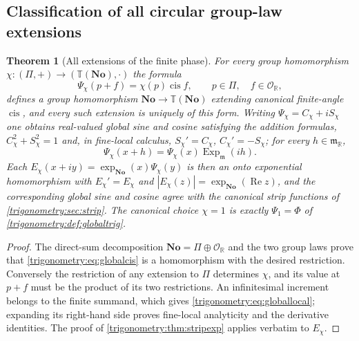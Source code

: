 \documentclass[11pt,letterpaper]{article}
\numberwithin{equation}{section}
\newtheorem{theorem}{Theorem}[section]
\theoremstyle{definition}
\theoremstyle{remark}
\newcommand{\No}{\mathbf{No}}
\newcommand{\R}{\mathbb R}
\newcommand{\OO}{\mathcal O}
\newcommand{\mm}{\mathfrak m}
\newcommand{\TT}{\mathbb T}
\newcommand{\re}{\operatorname{Re}}
\newcommand{\cis}{\operatorname{cis}}
\newcommand{\Ex}{\operatorname{Exp}_{\mm}}
\begin{document}
\subsection{Classification of all circular group-law extensions}
\begin{theorem}[All extensions of the finite phase]\label{trigonometry:thm:characters}
For every group homomorphism $\chi:(\Pi,+)\to(\TT(\No),\cdot)$ the formula
\begin{equation}\label{trigonometry:eq:globalcis}
 \Psi_\chi(p+f)=\chi(p)\cis f,\qquad p\in\Pi,\quad f\in\OO_{\R},
\end{equation}
defines a group homomorphism $\No\to\TT(\No)$ extending canonical finite-angle $\cis$, and every
such extension is uniquely of this form. Writing $\Psi_\chi=C_\chi+iS_\chi$ one obtains real-valued
global sine and cosine satisfying the addition formulas, $C_\chi^2+S_\chi^2=1$ and, in fine-local
calculus, $S_\chi'=C_\chi$, $C_\chi'=-S_\chi$; for every $h\in\mm_{\R}$,
\begin{equation}\label{trigonometry:eq:globallocal}
 \Psi_\chi(x+h)=\Psi_\chi(x)\Ex(ih).
\end{equation}
Each $E_\chi(x+iy)=\exp_{\No}(x)\Psi_\chi(y)$ is then an onto exponential homomorphism with
$E_\chi'=E_\chi$ and $|E_\chi(z)|=\exp_{\No}(\re z)$, and the corresponding global sine and cosine
agree with the canonical strip functions of \cref{trigonometry:sec:strip}. The canonical choice
$\chi=1$ is exactly $\Psi_1=\Phi$ of \cref{trigonometry:def:globaltrig}.
\end{theorem}
\begin{proof}
The direct-sum decomposition $\No=\Pi\oplus\OO_{\R}$ and the two group laws prove that
\cref{trigonometry:eq:globalcis} is a homomorphism with the desired restriction. Conversely the
restriction of any extension to $\Pi$ determines $\chi$, and its value at $p+f$ must be the product
of its two restrictions. An infinitesimal increment belongs to the finite summand, which gives
\cref{trigonometry:eq:globallocal}; expanding its right-hand side proves fine-local analyticity and
the derivative identities. The proof of \cref{trigonometry:thm:stripexp} applies verbatim to
$E_\chi$.
\end{proof}
\end{document}
